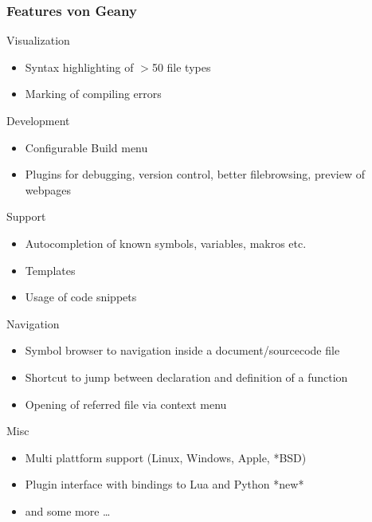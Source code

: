 \documentclass[compress]{beamer}
\begin{document}
	\begin{frame}[allowframebreaks]
		\frametitle{Features von Geany}

		\begin{block}{Visualization}
			\begin{itemize}
				\item Syntax highlighting of $>$50 file types
				\item Marking of compiling errors
			\end{itemize}
		\end{block}

		\begin{block}{Development}
			\begin{itemize}
				\item Configurable Build menu
				\item Plugins for debugging, version control,
					better filebrowsing, preview of webpages
			\end{itemize}
		\end{block}

		\begin{block}{Support}
			\begin{itemize}
				\item Autocompletion of known symbols, variables, makros etc.
				\item Templates
				\item Usage of code snippets
			\end{itemize}
		\end{block}

		\begin{block}{Navigation}
			\begin{itemize}
				\item Symbol browser to navigation inside a document/sourcecode file
				\item Shortcut to jump between declaration and definition of a function
				\item Opening of referred file via context menu
			\end{itemize}
		\end{block}

		\begin{block}{Misc}
			\begin{itemize}
				\item Multi plattform support (Linux, Windows, Apple, *BSD)
				\item Plugin interface with bindings to Lua and Python *new*
				\item and some more \dots
			\end{itemize}
		\end{block}
	\end{frame}
\end{document}
